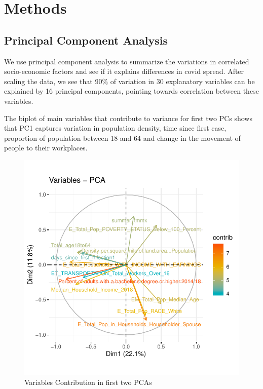\documentclass[
]{article}
\begin{document}
\hypertarget{methods}{%
\section{Methods}\label{methods}}

\hypertarget{principal-component-analysis}{%
\subsection{Principal Component
Analysis}\label{principal-component-analysis}}

We use principal component analysis to summarize the variations in
correlated socio-economic factors and see if it explains differences in
covid spread. After scaling the data, we see that 90\% of variation in
30 explanatory variables can be explained by 16 principal components,
pointing towards correlation between these variables.

The biplot of main variables that contribute to variance for first two
PCs shows that PC1 captures variation in population density, time since
first case, proportion of population between 18 and 64 and change in the
movement of people to their workplaces.

\begin{figure}
\centering
\includegraphics{Final-Project-Covid-19_files/figure-latex/unnamed-chunk-5-1.pdf}
\caption{Variables Contribution in first two PCAs}
\end{figure}
\end{document}
